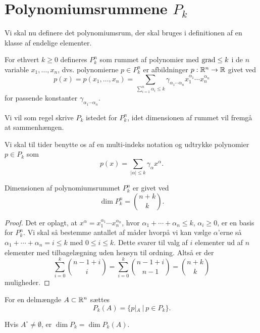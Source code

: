\section{Polynomiumsrummene $P_k$}
Vi skal nu definere det polynomiumsrum, der skal bruges i
definitionen af en klasse af endelige elementer.
\begin{definition}
For ethvert $k\geq0$ defineres $P_k^n$ som rummet af polynomier med
$\operatorname{grad} \leq k$ i de $n$ variable $x_1,\ldots,x_n$, dvs. polynomierne $p\in P_k^n$
er afbildninger $p:\mathbb{R}^n\rightarrow \mathbb{R}$ givet ved
\begin{equation}
    p(x)=p(x_1,\ldots,x_n)=
   \sum_{\sum_{i=1}^{n} \alpha_i \leq k} 
   \gamma_{\alpha_1 \cdots \alpha_n} x_1^{\alpha_1}\cdots x_n^{\alpha_n} 
\end{equation}
for passende konstanter $\gamma_{\alpha_1 \cdots \alpha_n}$. 
\end{definition}
\begin{remark}
Vi vil som regel skrive $P_k$ istedet for $P_k^n$, idet dimensionen af
rummet vil fremgå at sammenhængen.
\end{remark}
\begin{remark}
Vi skal til tider benytte os af en mul\-ti-in\-deks no\-ta\-ti\-on og
ud\-tryk\-ke polynomier $p\in P_k$ som
\begin{equation}
   p(x)=\sum_{|\alpha|\leq k} \gamma_{\alpha} x^{\alpha}. 
\end{equation}
\end{remark}
\begin{theorem}
Dimensionen af polynomiumsrummet $P_k^n$ er givet ved 
\begin{equation}
\dim P_k^n = \binom{n+k}{k}. 
\end{equation}
\end{theorem}
\begin{proof}
Det er oplagt, at $x^{\alpha} = x_1^{\alpha_1}\cdots x_n^{\alpha_n}$,
hvor $\alpha_1 + \cdots + \alpha_n \leq k$, $\alpha_i \geq 0$, er en
basis for $P_k^n$. Vi skal så bestemme antallet af måder hvorpå vi kan
vælge $\alpha$'erne så $\alpha_1 + \cdots + \alpha_n = i \leq k$ med
$0 \leq i \leq k$. Dette svarer til valg af $i$ elementer ud af $n$
elementer med tilbagelægning uden hensyn til ordning. Altså er der
\begin{equation}
  \sum_{i=0}^k \binom{n-1+i}{i} = \sum_{i=0}^k \binom{n-1+i}{n-1} = 
  \binom{n+k}{k} 
\end{equation}
muligheder. 
\end{proof}
\begin{definition}
For en delmængde $A\subset \mathbb{R}^n$ sættes
\begin{equation}
P_k(A)=\{p|_A \ |\  p\in P_k\}.
\end{equation}
\end{definition}
\begin{remark}
Hvis $A^\circ \not=\emptyset$, er $\dim P_k = \dim P_k(A)$.
\end{remark}

